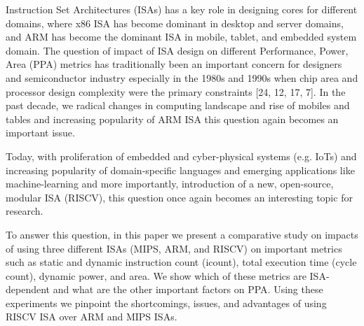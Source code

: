 Instruction Set Architectures (ISAs) has a key role in designing cores for different domains, where x86 ISA has become dominant in desktop and server domains, and ARM has become the dominant ISA in mobile, tablet, and embedded system domain. The question of impact of ISA design on different Performance, Power, Area (PPA) metrics has traditionally been an important concern for designers and semiconductor industry especially in the 1980s and 1990s when
chip area and processor design complexity were the primary
constraints [24, 12, 17, 7]. In the past decade, we radical changes in computing landscape and rise of mobiles and tables and increasing popularity of ARM ISA this question again becomes an important issue. 

Today, with proliferation of embedded and cyber-physical systems (e.g. IoTs) and increasing popularity of domain-specific languages and emerging applications like machine-learning and more importantly, introduction of a new, open-source, modular ISA (RISCV), this question once again becomes an interesting topic for research. 

To answer this question, in this paper we present a comparative study on impacts of using three different ISAs (MIPS, ARM, and RISCV) on important metrics such as static and dynamic instruction count (icount), total execution time (cycle count), dynamic power, and area. We show which of these metrics are ISA-dependent and what are the other important factors on PPA. Using these experiments we pinpoint the shortcomings, issues, and advantages of using RISCV ISA over ARM and MIPS ISAs. 


